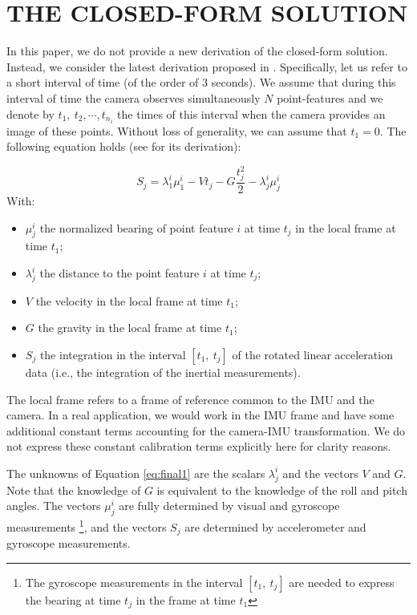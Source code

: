 \documentclass[letterpaper, 10 pt, conference]{ieeeconf}  %
\begin{document}
\section{THE CLOSED-FORM SOLUTION}

In this paper, we do not provide a new derivation of the closed-form solution.
Instead, we consider the latest derivation proposed in \cite{Martinelli2014}.
Specifically, let us refer to a short interval of time (of the order of $3$ seconds). We assume that during this interval of time the camera observes simultaneously $N$ point-features and we denote by $t_1,~t_2,\cdots,t_{n_i}$ the times of this interval when the camera provides an image of these points. Without loss of generality, we can assume that $t_1=0$.
The following equation holds (see \cite{Martinelli2014} for its derivation):


\begin{equation} \tag{6} \label{eq:final1}
S_j = \lambda_1^i\mu_1^i - V t_j - G \frac{t_j^2}{2} - \lambda^i_j \mu^i_j
\end{equation}
With:
\begin{itemize}
\item $\mu_j^i$ the normalized bearing of point feature $i$ at time $t_j$ in the local frame at time $t_1$;
\item $\lambda_j^i$ the distance to the point feature $i$ at time $t_j$;
\item $V$ the velocity in the local frame at time $t_1$;
\item $G$ the gravity in the local frame  at time $t_1$;
\item $S_j$ the integration in the interval $[t_1, ~t_j]$ of the rotated linear acceleration data (i.e., the integration of the inertial measurements).
\end{itemize}


The local frame refers to a frame of reference common to the IMU and the camera.
In a real application, we would work in the IMU frame and have some additional constant terms
accounting for the camera-IMU transformation.
We do not express these constant calibration terms explicitly here for clarity reasons.

The unknowns of Equation \ref{eq:final1} are the scalars $\lambda_j^i$ and the vectors $V$ and $G$.
Note that the knowledge of $G$ is equivalent to the knowledge of the roll and pitch angles.
The vectors $\mu_j^i$ are fully determined by visual and gyroscope measurements \footnote{The gyroscope measurements in the interval $[t_1, ~t_j]$ are needed to express the bearing at time $t_j$ in the frame at time $t_1$},
and the vectors $S_j$ are determined by accelerometer and gyroscope measurements.
\end{document}
